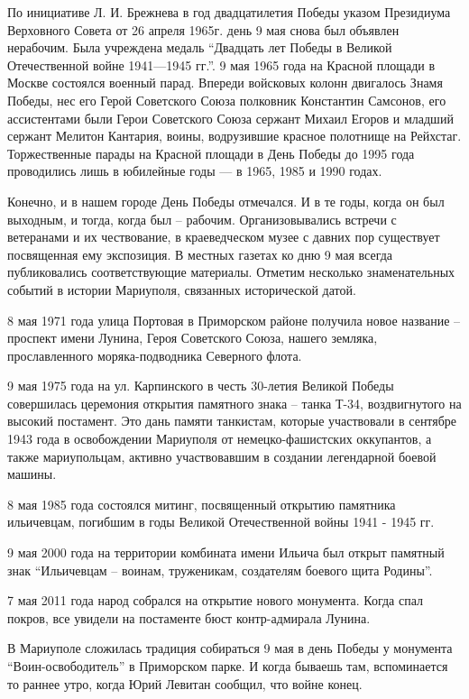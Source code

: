 По инициативе Л. И. Брежнева в год двадцатилетия Победы указом Президиума
Верховного Совета от 26 апреля 1965г. день 9 мая снова был объявлен нерабочим.
Была учреждена медаль \enquote{Двадцать лет Победы в Великой Отечественной
войне 1941—1945 гг.}.  9 мая 1965 года на Красной площади в Москве состоялся
военный парад. Впереди войсковых колонн двигалось Знамя Победы, нес его Герой
Советского Союза полковник Константин Самсонов, его ассистентами были Герои
Советского Союза сержант Михаил Егоров и младший сержант Мелитон Кантария,
воины, водрузившие красное полотнище на Рейхстаг. Торжественные парады на
Красной площади в День Победы до 1995 года проводились лишь в юбилейные годы —
в 1965, 1985 и 1990 годах. 

Конечно, и в нашем городе День Победы отмечался.  И в те годы, когда он был
выходным, и тогда, когда был – рабочим. Организовывались встречи с ветеранами и
их чествование, в краеведческом музее с давних пор существует посвященная ему
экспозиция. В местных газетах ко дню 9 мая всегда публиковались соответствующие
материалы. Отметим несколько знаменательных событий в истории Мариуполя,
связанных исторической датой.

8 мая 1971 года улица Портовая в Приморском районе получила новое название –
проспект имени Лунина, Героя Советского Союза, нашего земляка, прославленного
моряка-подводника Северного флота.  

9 мая 1975 года на ул. Карпинского в честь 30-летия Великой Победы совершилась
церемония открытия памятного знака – танка Т-34, воздвигнутого на высокий
постамент. Это дань памяти танкистам, которые участвовали в сентябре 1943 года
в освобождении Мариуполя от немецко-фашистских оккупантов, а также
мариупольцам, активно участвовавшим в создании легендарной боевой машины.

8 мая 1985 года состоялся митинг, посвященный открытию памятника ильичевцам,
погибшим в годы Великой Отечественной войны 1941 -  1945 гг.

9 мая 2000 года на территории комбината имени Ильича был открыт памятный знак
\enquote{Ильичевцам – воинам, труженикам, создателям боевого щита Родины}.

7 мая 2011 года народ собрался на открытие нового монумента. Когда спал покров,
все увидели на постаменте бюст контр-адмирала Лунина.

В Мариуполе сложилась традиция собираться 9 мая в день Победы у монумента
\enquote{Воин-освободитель} в Приморском парке. И когда бываешь там, вспоминается то
раннее утро, когда Юрий Левитан сообщил, что войне конец.
